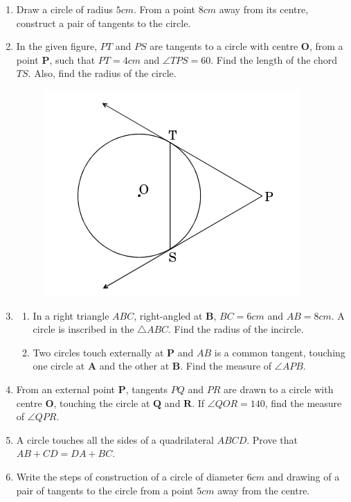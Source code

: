 \documentclass{article}
\let\vec\mathbf
\begin{document}
\begin{enumerate}
\begin{figure}[H]
			\caption{}
			\label{fig:circ-2}
		\end{figure}
	\item Draw a circle of radius $5 cm$. From a point $8 cm$ away from its centre, construct a pair of tangents to the circle.
	\item In the given figure, $PT$ and $PS$ are tangents to a circle with centre $\vec{O}$, from a point $\vec{P}$, such that $PT = 4 cm$ and $\angle TPS = 60$\degree. Find the length of the chord $TS$. Also, find the radius of the circle.
		\begin{figure}[H]
			\centering
			\includegraphics[width=\columnwidth]{figs/circ-3.png}
			\caption{}
			\label{fig:circ-3}
		\end{figure}
	\item \begin{enumerate}[label=(\alph*)]
			\item In a right triangle $ABC$, right-angled at $\vec{B}$, $BC = 6 cm$ and $AB = 8 cm$. A circle is inscribed in the $\triangle ABC$. Find the radius of the incircle.
			\item Two circles touch externally at $\vec{P}$ and $AB$ is a common tangent, touching one circle at $\vec{A}$ and the other at $\vec{B}$. Find the measure of $\angle APB$.
		\end{enumerate}
	\item From an external point $\vec{P}$, tangents $PQ$ and $PR$ are drawn to a circle with centre $\vec{O}$, touching the circle at $\vec{Q}$ and $\vec{R}$. If $\angle QOR = 140$\degree, find the measure of $\angle QPR$.
	\item A circle touches all the sides of a quadrilateral $ABCD$. Prove that $AB + CD = DA + BC$.
	\item Write the steps of construction of a circle of diameter $6 cm$ and drawing of a pair of tangents to the circle from a point $5 cm$ away from the centre.
\end{enumerate}
\end{document}
